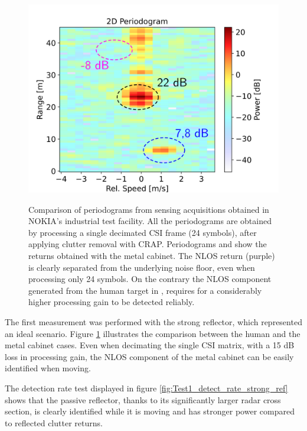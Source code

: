 \begin{figure}[H]
{		\includegraphics[scale=0.45]{Images/Test1/per_strong_ref/db_1frame_dec_CRAP_HUMAN_labelled_text22.png}
	}
	\caption[]{\small Comparison of periodograms from sensing acquisitions obtained in NOKIA's industrial test facility.
		All the periodograms are obtained by processing a single decimated CSI frame (24 symbols), after applying clutter removal with CRAP.
		Periodograms  and  show the returns obtained with the metal cabinet. The NLOS return (purple) is clearly separated from the underlying noise floor, even when processing only 24 symbols. On the contrary the NLOS component generated from the human target in , requires for a considerably higher processing gain to be detected reliably.}
	\label{fig:Test1_metal-human_comparison}
	\end{figure}
	
The first measurement was performed with the strong reflector, which represented an ideal scenario. 
Figure \ref{fig:Test1_metal-human_comparison} illustrates the comparison between the human and the metal cabinet cases. 
Even when decimating the single CSI matrix, with a 15 dB loss in processing gain, the NLOS component of the metal cabinet can be easily identified when moving.

The detection rate test displayed in figure \ref{fig:Test1_detect_rate_strong_ref} shows that the passive reflector, thanks to its significantly larger radar cross section, is clearly identified while it is moving and has stronger power compared to reflected clutter returns.

